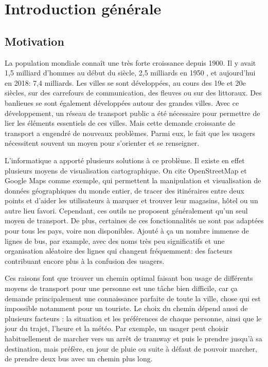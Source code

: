 \chapter{Introduction générale}
\newpage	
\section{Motivation}
La population mondiale connaît une très forte croissance depuis 1900. 
Il y avait 1,5 milliard d'hommes au début du siècle, 2,5 milliards en 1950 , et aujourd'hui en 2018: 7,4 milliards. 
Les villes se sont développées, au cours des 19e et 20e siècles, sur des carrefours de communication, des fleuves ou sur des littoraux. Des banlieues se sont également développées autour des grandes villes. 
Avec ce développement, un réseau de transport public a été nécessaire pour permettre de lier les éléments essentiels de ces villes. 
Mais cette demande croissante de transport a engendré de nouveaux problèmes. Parmi eux, le fait que les usagers nécessitent souvent un moyen pour s'orienter et se renseigner.

L'informatique a apporté plusieurs solutions à ce problème. Il existe en effet plusieurs moyens de visualisation cartographique.
On cite OpenStreetMap et Google Maps comme exemple, qui permettent la manipulation et visualisation de données géographiques du monde entier, de tracer des itinéraires entre deux points et d'aider les utilisateurs à marquer et trouver leur magasins, hôtel ou un autre lieu favori.
Cependant, ces outils ne proposent généralement qu'un seul moyen de transport. De plus, certaines de ces fonctionnalités ne sont pas adaptées pour tous les pays, voire non disponibles.
Ajouté à ça un nombre immense de lignes de bus, par example, avec des noms très peu significatifs et une organisation aléatoire des lignes qui changent fréquemment: des facteurs contribuant encore plus à la confusion des usagers. 


Ces raisons font que trouver un chemin optimal faisant bon usage de différents moyens de transport pour une personne est une tâche bien difficile, car ça demande principalement une connaissance parfaite de toute la ville, chose qui est impossible notamment pour un touriste.
Le choix du chemin dépend aussi de plusieurs facteurs : la situation et les préférences de chaque personne, ainsi que le jour du trajet, l'heure et la météo.
Par exemple, un usager peut choisir habituellement de marcher vers un arrêt de tramway et puis le prendre jusqu'à sa destination, mais préfère, en jour de pluie ou suite à défaut de pouvoir marcher, de prendre deux bus avec un chemin plus long.


